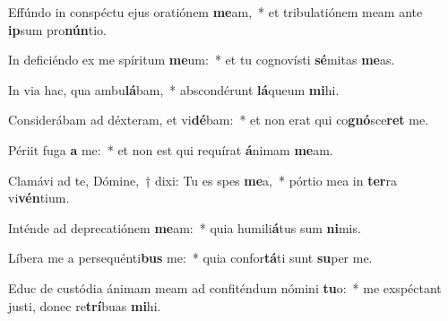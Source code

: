 \item Effúndo in conspéctu ejus oratiónem \textbf{me}am,~* et tribulatiónem meam ante \textbf{ip}sum pro\textbf{nún}tio.
\item In deficiéndo ex me spíritum \textbf{me}um:~* et tu cognovísti \textbf{sé}mitas \textbf{me}as.
\item In via hac, qua ambu\textbf{lá}bam,~* abscondérunt \textbf{lá}queum \textbf{mi}hi.
\item Considerábam ad déxteram, et vi\textbf{dé}bam:~* et non erat qui co\textbf{gnó}sce\textbf{ret} me.
\item Périit fuga \textbf{a} me:~* et non est qui requírat \textbf{á}nimam \textbf{me}am.
\item Clamávi ad te, Dómine,~† dixi: Tu es spes \textbf{me}a,~* pórtio mea in \textbf{ter}ra vi\textbf{vén}tium.
\item Inténde ad deprecatiónem \textbf{me}am:~* quia humili\textbf{á}tus sum \textbf{ni}mis.
\item Líbera me a persequénti\textbf{bus} me:~* quia confor\textbf{tá}ti sunt \textbf{su}per me.
\item Educ de custódia ánimam meam ad confiténdum nómini \textbf{tu}o:~* me exspéctant justi, donec re\textbf{trí}buas \textbf{mi}hi.
